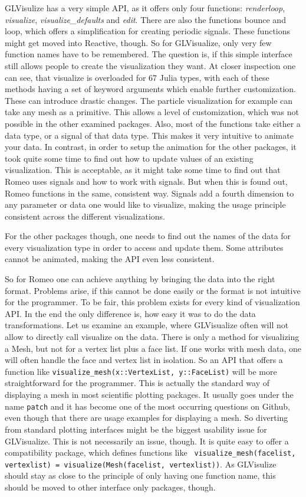 {GLVisulize has a very simple API, as it offers only four functions: \textit{renderloop}, \textit{visualize}, \textit{visualize\_defaults} and \textit{edit}.
There are also the functions bounce and loop, which offers a simplification for creating periodic signals.
These functions might get moved into Reactive, though.
So for GLVisualize, only very few function names have to be remembered.
The question is, if this simple interface still allows people to create the visualization they want.
At closer inspection one can see, that visualize is overloaded for 67 Julia types, with each of these methods having a set of keyword arguments which enable further customization.
These can introduce drastic changes. The particle visualization for example can take any mesh as a primitive. This allows a level of customization, which was not possible in the other examined packages.
Also, most of the functions take either a data type, or a signal of that data type.
This makes it very intuitive to animate your data. 
In contrast, in order to setup the animation for the other packages, it took quite some time to find out how to update values of an existing visualization. This is acceptable, as it might take some time to find out that Romeo uses signals and how to work with signals.
But when this is found out, Romeo functions in the same, consistent way. 
Signals add a fourth dimension to any parameter or data one would like to visualize, making the usage principle consistent across the different visualizations.

For the other packages though, one needs to find out the names of the data for every visualization type in order to access and update them. Some attributes cannot be animated, making the API even less consistent.

So for Romeo one can achieve anything by bringing the data into the right format.
Problems arise, if this cannot be done easily or the format is not intuitive for the programmer.
To be fair, this problem exists for every kind of visualization API.
In the end the only difference is, how easy it was to do the data transformations. 
Let us examine an example, where GLVisualize often will not allow to directly call visualize on the data.
There is only a method for visualizing a Mesh, but not for a vertex list plus a face list. 
If one works with mesh data, one will often handle the face and vertex list in isolation.
So an API that offers a function like \texttt{visualize\_mesh(x::VertexList, y::FaceList)} will be more straightforward for the programmer.
This is actually the standard way of displaying a mesh in most scientific plotting packages. It usually goes under the name \texttt{patch} and it has become one of the most occurring questions on Github, even though that there are usage examples for displaying a mesh.
So diverting from standard plotting interfaces might be the biggest usability issue for GLVisualize.
This is not necessarily an issue, though. 
It is quite easy to offer a compatibility package, which defines functions like \texttt{
visualize\_mesh(facelist, vertexlist) = visualize(Mesh(facelist, vertexlist))}.
As GLVisulize should stay as close to the principle of only having one function name, this should be moved to other interface only packages, though.

}
